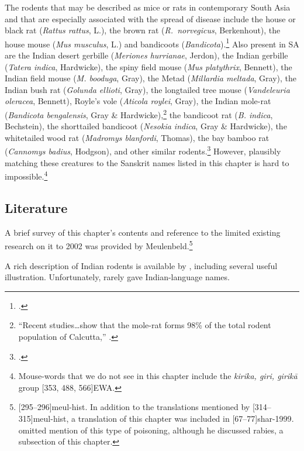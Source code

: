 The rodents that may be described as mice or rats in contemporary
South Asia and that are especially associated with the spread of
disease include the 
house or black rat (\emph{Rattus rattus}, L.), 
the brown rat (\emph{R.\ norvegicus}, Berkenhout), the 
house mouse (\emph{Mus musculus}, L.) and 
bandicoots (\emph{Bandicota}).\footcite[194]{bia} 
Also present in SA are the 
Indian desert gerbille (\emph{Meriones hurrianae}, Jerdon), 
the Indian gerbille (\emph{Tatera indica}, Hardwicke), 
the spiny field mouse (\emph{Mus platythrix}, Bennett),
the Indian field mouse (\emph{M. booduga}, Gray), 
the Metad (\emph{Millardia meltada}, Gray),
the Indian bush rat (\emph{Golunda ellioti}, Gray), 
the longtailed tree mouse (\emph{Vandeleuria oleracea}, Bennett), 
Royle's vole (\emph{Aticola roylei}, Gray), 
the Indian mole-rat (\emph{Bandicota bengalensis}, Gray \& 
Hardwicke),\footnote{“Recent studies\ldots show that the mole-rat forms 
98\% of the total rodent population of Calcutta,” \cite[206]{bia}.} 
the bandicoot rat (\emph{B. indica}, Bechstein), 
the shorttailed bandicoot (\emph{Nesokia indica}, Gray \& Hardwicke),
the whitetailed wood rat (\emph{Madromys blanfordi}, Thomas), 
the bay bamboo rat (\emph{Cannomys badius}, Hodgson),
and other similar rodents.\footcite[ill.\ plates \,45, 46 \emph{et passim}]{bia}
However, plausibly matching these creatures to the Sanskrit names listed in 
this chapter is hard to impossible.\footnote{Mouse-words that we do not see 
in this chapter include the \emph{kirika, giri, girikā} 
group [353, 488, 566]{EWA}.}


\subsection{Literature}

A brief survey of this chapter's contents and reference to the
limited existing research on it to 2002 was provided by
Meulenbeld.\footnote{[295--296]{meul-hist}. In addition
    to the translations mentioned by [314--315]{meul-hist},
    a translation of this chapter was included in
    [67--77]{shar-1999}. \citet{sekh-2023} omitted mention of
    this type of poisoning, although he discussed rabies, a subsection of
    this chapter.}
    

A rich description of Indian rodents is available by \citet[ch.\,13,
esp.\,205--215]{bia}, including several useful illustration. 
Unfortunately, \citeauthor{bia} rarely gave Indian-language
names.

